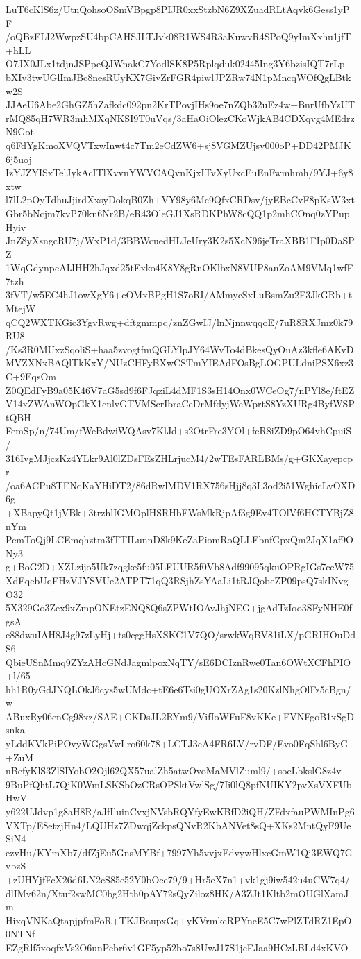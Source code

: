 LuT6cKlS6z/UtnQohsoOSmVBpgp8PIJR0xxStzbN6Z9XZuadRLtAqvk6Gess1yPF
/oQBzFLI2WwpzSU4bpCAHSJLTJvk08R1WS4R3aKuwvR4SPoQ9yImXxhu1jfT+hLL
O7JX0JLx1tdjnJSPpeQJWnakC7YodlSK8P5Rplqduk02445Ing3Y6bzisIQT7rLp
bXIv3twUGlImJBc8nesRUyKX7GivZrFGR4piwlJPZRw74N1pMncqWOfQgLBtkw2S
JJAeU6Abe2GhGZ5hZafkdc092pn2KrTPovjIHs9oe7nZQb32uEz4w+BnrUfbYzUT
rMQ85qH7WR3mhMXqNKSI9T0uVqs/3aHaOiOlezCKoWjkAB4CDXqvg4MEdrzN9Got
q6FdYgKmoXVQVTxwInwt4c7Tm2eCdZW6+sj8VGMZUjsv000oP+DD42PMJK6j5uoj
IzYJZYISxTelJykAcITlXvvnYWVCAQvnKjxITvXyUxcEuEnFwmhmh/9YJ+6y8xtw
l7lL2pOyTdhuJjirdXxsyDokqB0Zh+VY98y6Mc9QfxCRDsv/jyEBcCvF8pKsW3xt
Gbr5bNcjm7kvP70kn6Nr2B/eR43OleGJ1XsRDKPhW8cQQ1p2mhCOnq0zYPupHyiv
JnZ8yXsngcRU7j/WxP1d/3BBWcuedHLJeUry3K2s5XcN96jeTraXBB1FIp0DaSPZ
1WqGdynpeAIJHH2hJqxd25tExko4K8Y8gRnOKlbxN8VUP8anZoAM9VMq1wfF7tzh
3fVT/w5EC4hJ1owXgY6+cOMxBPgH1S7oRI/AMmycSxLuBsmZu2F3JkGRb+tMtejW
qCQ2WXTKGic3YgvRwg+dftgmmpq/znZGwIJ/lnNjnnwqqoE/7uR8RXJmz0k79RU8
/Ks3R0MUxzSqoliS+haa5zvogtfmQGLYlpJY64WvTo4dBkesQyOuAz3kfle6AKvD
MVZXNxBAQlTkKxY/NUzCHFyBXwCSTmYIEAdFOsBgLOGPULdniPSX6xz3C+9EqsOm
Z0QEdFyB9a05K46V7aG5sd9f6FJqziL4dMF1S3sH14Onx0WCeOg7/nPYl8e/ftEZ
V14xZWAnWOpGkX1cnlvGTVMScrIbraCeDrMfdyjWeWprtS8YzXURg4ByfWSPtQBH
FemSp/n/74Um/fWeBdwiWQAsv7KlJd+s2OtrFre3YOl+feR8iZD9pO64vhCpuiS/
316IvgMJjczKz4YLkr9Al0lZDsFEsZHLrjucM4/2wTEsFARLBMs/g+GKXayepcpr
/oa6ACPu8TENqKaYHiDT2/86dRwlMDV1RX756sHjj8q3L3od2i51WghicLvOXD6g
+XBapyQt1jVBk+3trzhlIGMOplHSRHbFWsMkRjpAf3g9Ev4TOlVf6HCTYBjZ8nYm
PemToQj9LCEmqhztm3fTTILunnD8k9KeZaPiomRoQLLEbnfGpxQm2JqX1af9ONy3
g+BoG2D+XZLzijo5Uk7zqgke5fu05LFUUR5f0Vb8Adf99095qkuOPRgIGs7ccW75
XdEqebUqFHzVJYSVUe2ATPT71qQ3RSjhZsYAaLi1tRJQobeZP09psQ7skINvgO32
5X329Go3Zex9xZmpONEtzENQ8Q6sZPWtIOAvJhjNEG+jgAdTzIoo3SFyNHE0fgsA
c88dwuIAH8J4g97zLyHj+ts0cggHsXSKC1V7QO/srwkWqBV81iLX/pGRIHOuDdS6
QbieUSnMmq9ZYzAHcGNdJagmlpoxNqTY/sE6DCIznRwe0Tan6OWtXCFhPIO+l/65
hh1R0yGdJNQLOkJ6cys5wUMdc+tE6e6Tsi0gUOXrZAg1s20KzlNhgOlFz5cBgn/w
ABuxRy06enCg98xz/SAE+CKDsJL2RYm9/VifIoWFuF8vKKe+FVNFgoB1xSgDsnka
yLddKVkPiPOvyWGgsVwLro60k78+LCTJ3cA4FR6LV/rvDF/Evo0FqShl6ByG+ZuM
nBefyKlS3ZlSlYobO2Ojl62QX57ualZh5atwOvoMaMVlZuml9/+soeLbkslG8z4v
9BuPfQhtL7QjK0WmLSKSbOzCRsOPSktVwlSg/7Ii0lQ8pfNUIKY2pvXsVXFUbHwV
y622UJdvp1g8aH8R/aJfIluinCvxjNVsbRQYfyEwKBfD2iQH/ZFdxfauPWMInPg6
VXTp/E8etzjHn4/LQUHz7ZDwqjZckpsQNvR2KbANVet8sQ+XKs2MntQyF9UeSiN4
ezvHu/KYmXb7/dfZjEu5GnsMYBf+7997Yh5vvjxEdvywHlxcGmW1Qj3EWQ7GvbzS
+zUHYjfFcX26d6LN2cS85e52Y0bOce79/9+Hr5eX7n1+vk1gj9iw542u4uCW7q4/
dlIMv62n/Xtuf2swMC0bg2Hth0pAY72sQyZiloz8HK/A3ZJt1Kltb2mOUGlXamJm
HixqVNKaQtapjpfmFoR+TKJBaupxGq+yKVrmkcRPYneE5C7wPlZTdRZ1EpO0NTNf
EZgRlf5xoqfxVs2O6unPebr6v1GF5yp52bo7s8UwJ17S1jcFJaa9HCzLBLd4xKVO
